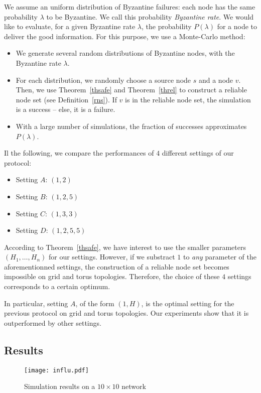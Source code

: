 \documentclass[a4paper,11pt]{article}
\begin{document}
We assume an uniform distribution of Byzantine failures: each node has the same probability $\lambda$ to be Byzantine. We call this probability \emph{Byzantine rate}. We would like to evaluate, for a given Byzantine rate $\lambda$, the probability $P(\lambda)$ for a node to deliver the good information.
For this purpose, we use a Monte-Carlo method:

\begin{itemize}
\item We generate several random distributions of Byzantine nodes, with the Byzantine rate $\lambda$.
\item For each distribution, we randomly choose a source node $s$ and a node $v$. Then, we use Theorem~\ref{thsafe} and Theorem~\ref{threl} to construct a reliable node set (see Definition~\ref{rns}). If $v$ is in the reliable node set, the simulation is a success -- else, it is a failure.
\item With a large number of simulations, the fraction of successes approximates $P(\lambda)$.
\end{itemize}

Il the following, we compare the performances of $4$ different settings of our protocol:
\begin{itemize}
\item Setting $A$: $(1,2)$
\item Setting $B$: $(1,2,5)$
\item Setting $C$: $(1,3,3)$
\item Setting $D$: $(1,2,5,5)$
\end{itemize}

According to Theorem~\ref{thsafe}, we have interest to use the smaller parameters $(H_1,\dots,H_n)$ for our settings. However, if we substract $1$ to \emph{any} parameter of the aforementionned settings, the construction of a reliable node set becomes impossible on grid and torus topologies. Therefore, the choice of these $4$ settings corresponds to a certain optimum.

In particular, setting $A$, of the form $(1,H)$, is the optimal setting for the previous protocol \cite{Trig} on grid and torus topologies. Our experiments show that it is outperformed by other settings.

\subsection{Results}

\begin{figure*}
\begin{center}
\texttt{[image: influ.pdf]}
\caption{Simulation results on a $10 \times 10$ network} 
\label{fig:simu1}
\end{center}
\end{figure*}
\end{document}

